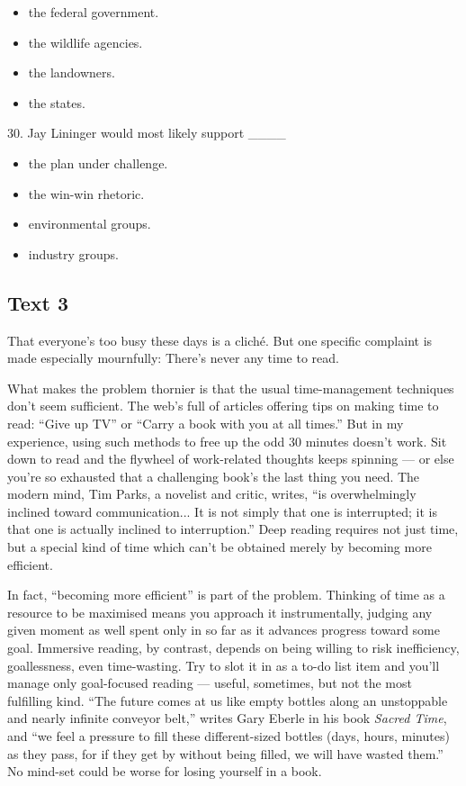 \documentclass[UTF8,11pt]{ctexart}
\begin{document}
\begin{itemize}[leftmargin=2em,itemsep=.2em,topsep=.4em]\item[A.] the federal government.
\item[B.] the wildlife agencies.
\item[C.] the landowners.
\item[D.] the states.
\end{itemize}

30. Jay Lininger would most likely support \_\_\_\_


\begin{itemize}[leftmargin=2em,itemsep=.2em,topsep=.4em]\item[A.] the plan under challenge.
\item[B.] the win-win rhetoric.
\item[C.] environmental groups.
\item[D.] industry groups.
\end{itemize}

\subsection*{\textbf{Text 3}}


That everyone’s too busy these days is a cliché. But one specific complaint is made especially mournfully: There’s never any time to read.


What makes the problem thornier is that the usual time-management techniques don’t seem sufficient. The web’s full of articles offering tips on making time to read: “Give up TV” or “Carry a book with you at all times.” But in my experience, using such methods to free up the odd 30 minutes doesn’t work. Sit down to read and the flywheel of work-related thoughts keeps spinning — or else you’re so exhausted that a challenging book’s the last thing you need. The modern mind, Tim Parks, a novelist and critic, writes, “is overwhelmingly inclined toward communication... It is not simply that one is interrupted; it is that one is actually inclined to interruption.” Deep reading requires not just time, but a special kind of time which can’t be obtained merely by becoming more efficient.


In fact, “becoming more efficient” is part of the problem. Thinking of time as a resource to be maximised means you approach it instrumentally, judging any given moment as well spent only in so far as it advances progress toward some goal. Immersive reading, by contrast, depends on being willing to risk inefficiency, goallessness, even time-wasting. Try to slot it in as a to-do list item and you’ll manage only goal-focused reading — useful, sometimes, but not the most fulfilling kind. “The future comes at us like empty bottles along an unstoppable and nearly infinite conveyor belt,” writes Gary Eberle in his book \textit{Sacred Time}, and “we feel a pressure to fill these different-sized bottles (days, hours, minutes) as they pass, for if they get by without being filled, we will have wasted them.” No mind-set could be worse for losing yourself in a book.
\end{document}
